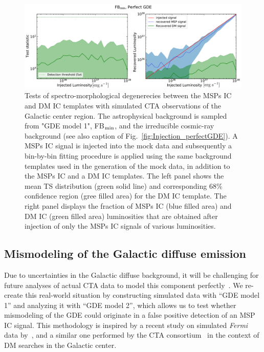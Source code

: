 \documentclass[doublespace,nopageskip]{VTthesis}
\begin{document}
\begin{figure}[htb]
    \begin{center}
    \includegraphics[width=\textwidth]{Figures/CTA/TS-dm-mis-False-Fermi-min-True.pdf}
    \caption{Tests of spectro-morphological degenerecies between the MSPs IC and DM IC templates with simulated CTA observations of the Galactic center region. The astrophysical background is sampled from "GDE model 1", FB$_{\rm min}$, and the irreducible cosmic-ray background (see also caption of Fig.~\ref{fig:Injection_perfectGDE}). A MSPs IC signal is injected into the mock data and subsequently a bin-by-bin fitting procedure is applied using the same background templates used in the generation of the mock data, in addition to the MSPs IC and a DM IC templates. The left panel shows the mean TS distribution (green solid line) and corresponding 68\% confidence region (gree filled area) for the DM IC template. The right panel displays the fraction of MSPs IC (blue filled area) and DM IC (green filled area) luminosities that are obtained after injection of only the MSPs IC signals of various luminosities. }
    \label{fig:MSPsvsDM_perfectGDE}
    \end{center}
\end{figure}

\subsection{Mismodeling of the Galactic diffuse emission}
\label{subsec:GDEmismodeling}

Due to uncertainties in the Galactic diffuse background, it will be challenging for future analyses of actual CTA data to model this component perfectly~\citep{2021JCAP...01..057A}. 
%
We re-create this  
real-world situation
by constructing simulated data with ``GDE model 1'' and analyzing it with ``GDE model 2'', which allows us to test whether mismodeling of the GDE could originate in a false positive detection of an MSP IC signal. This methodology is inspired by a recent study on simulated {\it Fermi} data by~\citep{2020PhRvD.101b3014C}, and a similar one performed by the CTA consortium~\citep{2021JCAP...01..057A} in the context of DM searches in the Galactic center. 
\end{document}
